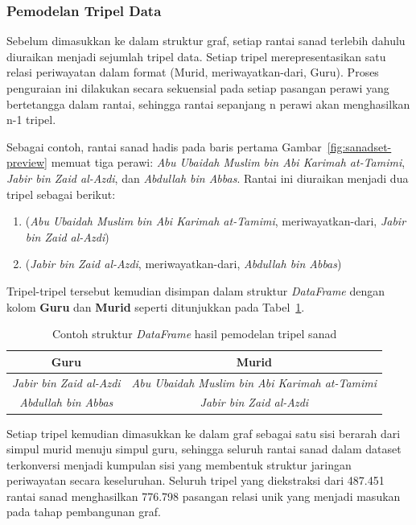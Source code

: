 \subsubsection{Pemodelan Tripel Data}
Sebelum dimasukkan ke dalam struktur graf, setiap rantai sanad terlebih dahulu diuraikan menjadi sejumlah tripel data. Setiap tripel merepresentasikan satu relasi periwayatan dalam format (Murid, meriwayatkan-dari, Guru). Proses penguraian ini dilakukan secara sekuensial pada setiap pasangan perawi yang bertetangga dalam rantai, sehingga rantai sepanjang n perawi akan menghasilkan n-1 tripel.

Sebagai contoh, rantai sanad hadis pada baris pertama Gambar~\ref{fig:sanadset-preview} memuat tiga perawi: \textit{Abu Ubaidah Muslim bin Abi Karimah at-Tamimi}, \textit{Jabir bin Zaid al-Azdi}, dan \textit{Abdullah bin Abbas}. Rantai ini diuraikan menjadi dua tripel sebagai berikut:

\begin{enumerate}
    \item (\textit{Abu Ubaidah Muslim bin Abi Karimah at-Tamimi}, meriwayatkan-dari, \textit{Jabir bin Zaid al-Azdi})
    \item (\textit{Jabir bin Zaid al-Azdi}, meriwayatkan-dari, \textit{Abdullah bin Abbas})
\end{enumerate}

Tripel-tripel tersebut kemudian disimpan dalam struktur \textit{DataFrame} dengan kolom \textbf{Guru} dan \textbf{Murid} seperti ditunjukkan pada Tabel~\ref{tab:tripel-dataframe}.

\begin{table}[H]
\centering
\caption{Contoh struktur \textit{DataFrame} hasil pemodelan tripel sanad}
\label{tab:tripel-dataframe}
\renewcommand{\arraystretch}{1.4}
\begin{tabular}{|c|c|}
\hline
\textbf{Guru} & \textbf{Murid} \\
\hline
\textit{Jabir bin Zaid al-Azdi} & \textit{Abu Ubaidah Muslim bin Abi Karimah at-Tamimi} \\
\hline
\textit{Abdullah bin Abbas} & \textit{Jabir bin Zaid al-Azdi} \\
\hline
\end{tabular}
\end{table}

Setiap tripel kemudian dimasukkan ke dalam graf sebagai satu sisi berarah dari simpul murid menuju simpul guru, sehingga seluruh rantai sanad dalam dataset terkonversi menjadi kumpulan sisi yang membentuk struktur jaringan periwayatan secara keseluruhan. Seluruh tripel yang diekstraksi dari 487.451 rantai sanad menghasilkan 776.798 pasangan relasi unik yang menjadi masukan pada tahap pembangunan graf.

